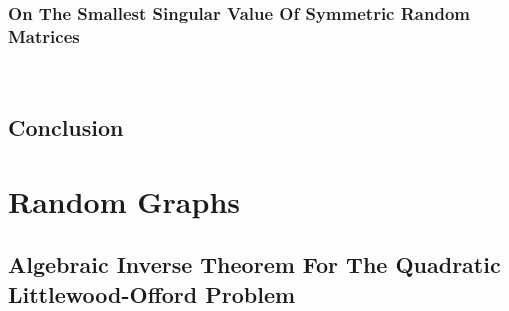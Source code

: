 \documentclass[12pt]{article}
\begin{document}
 

\subsubsection{On The Smallest Singular Value Of Symmetric Random Matrices}

\\\newline

\subsection{Conclusion}

\newpage
\section{Random Graphs}







\subsection{Algebraic Inverse Theorem For The
    Quadratic Littlewood-Offord Problem}





\newpage
\printbibliography
\end{document}

